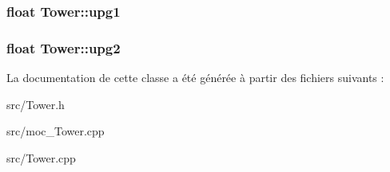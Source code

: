\label{classTower_a94a20f8350f5f56015216ce4c81a41f7}
\hypertarget{classTower_a141e6c72b5190821851e02a5ca412535}{
\subsubsection[{upg1}]{\setlength{\rightskip}{0pt plus 5cm}float {\bf Tower::upg1}}}
\label{classTower_a141e6c72b5190821851e02a5ca412535}
\hypertarget{classTower_a53ab9046925a4c9b403fb41b0ca4a5d4}{
\subsubsection[{upg2}]{\setlength{\rightskip}{0pt plus 5cm}float {\bf Tower::upg2}}}
\label{classTower_a53ab9046925a4c9b403fb41b0ca4a5d4}


La documentation de cette classe a été générée à partir des fichiers suivants :\begin{DoxyCompactItemize}
\item 
src/Tower.h\item 
src/moc\_\-Tower.cpp\item 
src/Tower.cpp\end{DoxyCompactItemize}
